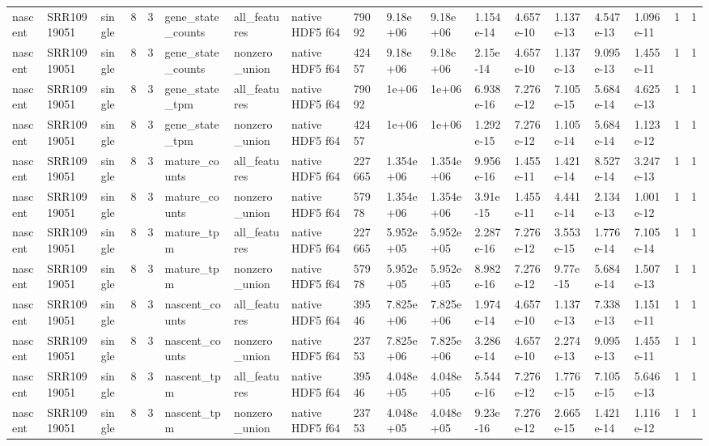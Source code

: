 \begin{tabular}{llllllllllllllllll}
nascent & SRR10919051 & single & 8 & 3 & gene\_state\_counts & all\_features & native HDF5 f64 & 79092 & 9.18e+06 & 9.18e+06 & 1.154e-14 & 4.657e-10 & 1.137e-13 & 4.547e-13 & 1.096e-11 & 1 & 1 \\
nascent & SRR10919051 & single & 8 & 3 & gene\_state\_counts & nonzero\_union & native HDF5 f64 & 42457 & 9.18e+06 & 9.18e+06 & 2.15e-14 & 4.657e-10 & 1.137e-13 & 9.095e-13 & 1.455e-11 & 1 & 1 \\
nascent & SRR10919051 & single & 8 & 3 & gene\_state\_tpm & all\_features & native HDF5 f64 & 79092 & 1e+06 & 1e+06 & 6.938e-16 & 7.276e-12 & 7.105e-15 & 5.684e-14 & 4.625e-13 & 1 & 1 \\
nascent & SRR10919051 & single & 8 & 3 & gene\_state\_tpm & nonzero\_union & native HDF5 f64 & 42457 & 1e+06 & 1e+06 & 1.292e-15 & 7.276e-12 & 1.105e-14 & 5.684e-14 & 1.123e-12 & 1 & 1 \\
nascent & SRR10919051 & single & 8 & 3 & mature\_counts & all\_features & native HDF5 f64 & 227665 & 1.354e+06 & 1.354e+06 & 9.956e-16 & 1.455e-11 & 1.421e-14 & 8.527e-14 & 3.247e-13 & 1 & 1 \\
nascent & SRR10919051 & single & 8 & 3 & mature\_counts & nonzero\_union & native HDF5 f64 & 57978 & 1.354e+06 & 1.354e+06 & 3.91e-15 & 1.455e-11 & 4.441e-14 & 2.134e-13 & 1.001e-12 & 1 & 1 \\
nascent & SRR10919051 & single & 8 & 3 & mature\_tpm & all\_features & native HDF5 f64 & 227665 & 5.952e+05 & 5.952e+05 & 2.287e-16 & 7.276e-12 & 3.553e-15 & 1.776e-14 & 7.105e-14 & 1 & 1 \\
nascent & SRR10919051 & single & 8 & 3 & mature\_tpm & nonzero\_union & native HDF5 f64 & 57978 & 5.952e+05 & 5.952e+05 & 8.982e-16 & 7.276e-12 & 9.77e-15 & 5.684e-14 & 1.507e-13 & 1 & 1 \\
nascent & SRR10919051 & single & 8 & 3 & nascent\_counts & all\_features & native HDF5 f64 & 39546 & 7.825e+06 & 7.825e+06 & 1.974e-14 & 4.657e-10 & 1.137e-13 & 7.338e-13 & 1.151e-11 & 1 & 1 \\
nascent & SRR10919051 & single & 8 & 3 & nascent\_counts & nonzero\_union & native HDF5 f64 & 23753 & 7.825e+06 & 7.825e+06 & 3.286e-14 & 4.657e-10 & 2.274e-13 & 9.095e-13 & 1.455e-11 & 1 & 1 \\
nascent & SRR10919051 & single & 8 & 3 & nascent\_tpm & all\_features & native HDF5 f64 & 39546 & 4.048e+05 & 4.048e+05 & 5.544e-16 & 7.276e-12 & 1.776e-15 & 7.105e-15 & 5.646e-13 & 1 & 1 \\
nascent & SRR10919051 & single & 8 & 3 & nascent\_tpm & nonzero\_union & native HDF5 f64 & 23753 & 4.048e+05 & 4.048e+05 & 9.23e-16 & 7.276e-12 & 2.665e-15 & 1.421e-14 & 1.116e-12 & 1 & 1 \\
\bottomrule
\end{tabular}
